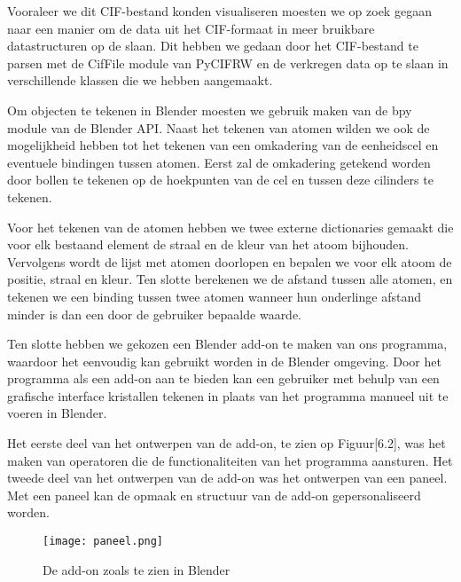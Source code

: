 \par
Vooraleer we dit CIF-bestand konden visualiseren moesten we op zoek gegaan naar een manier om de data uit het CIF-formaat in meer bruikbare datastructuren op de slaan. Dit hebben we gedaan door het CIF-bestand te parsen met de CifFile module van PyCIFRW en de verkregen data op te slaan in verschillende klassen die we hebben aangemaakt. 
\par
Om objecten te tekenen in Blender moesten we gebruik maken van de bpy module van de Blender API. Naast het tekenen van atomen wilden we ook de mogelijkheid hebben tot het tekenen van een omkadering van de eenheidscel en eventuele bindingen tussen atomen. Eerst zal de omkadering getekend worden door bollen te tekenen op de hoekpunten van de cel en tussen deze cilinders te tekenen. 
\par
Voor het tekenen van de atomen hebben we twee externe dictionaries gemaakt die voor elk bestaand element de straal en de kleur van het atoom bijhouden. Vervolgens wordt de lijst met atomen doorlopen en bepalen we voor elk atoom de positie, straal en kleur. Ten slotte berekenen we de afstand tussen alle atomen, en tekenen we een binding tussen twee atomen wanneer hun onderlinge afstand minder is dan een door de gebruiker bepaalde waarde. 
\par
Ten slotte hebben we gekozen een Blender add-on te maken van ons programma, waardoor het eenvoudig kan gebruikt worden in de Blender omgeving. Door het programma als een add-on aan te bieden kan een gebruiker met behulp van een grafische interface kristallen tekenen in plaats van het programma manueel uit te voeren in Blender. 
\par
Het eerste deel van het ontwerpen van de add-on, te zien op Figuur[6.2], was het maken van operatoren die de functionaliteiten van het programma aansturen. Het tweede deel van het ontwerpen van de add-on was het ontwerpen van een paneel. Met een paneel kan de opmaak en structuur van de add-on gepersonaliseerd worden. 
\par  
\begin{figure}[H]
\texttt{[image: paneel.png]}
\caption{De add-on zoals te zien in Blender}
\end{figure}


